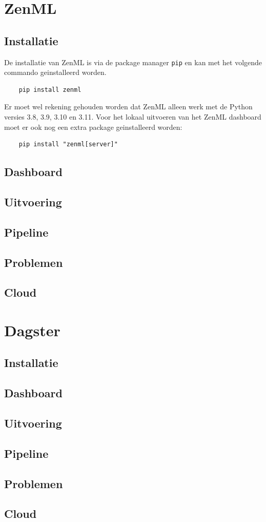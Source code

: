 \section{ZenML}
\subsection{Installatie}
De installatie van ZenML is via de package manager \verb+pip+ en kan met het volgende commando geinstalleerd worden.
\begin{verbatim}
    pip install zenml
\end{verbatim}
Er moet wel rekening gehouden worden dat ZenML alleen werk met de Python versies 3.8, 3.9, 3.10 en 3.11.
Voor het lokaal uitvoeren van het ZenML dashboard moet er ook nog een extra package geinstalleerd worden:
\begin{verbatim}
    pip install "zenml[server]"
\end{verbatim}
\subsection{Dashboard}
\subsection{Uitvoering}
\subsection{Pipeline}
\subsection{Problemen}
\subsection{Cloud}
\section{Dagster}
\subsection{Installatie}
\subsection{Dashboard}
\subsection{Uitvoering}
\subsection{Pipeline}
\subsection{Problemen}
\subsection{Cloud}


